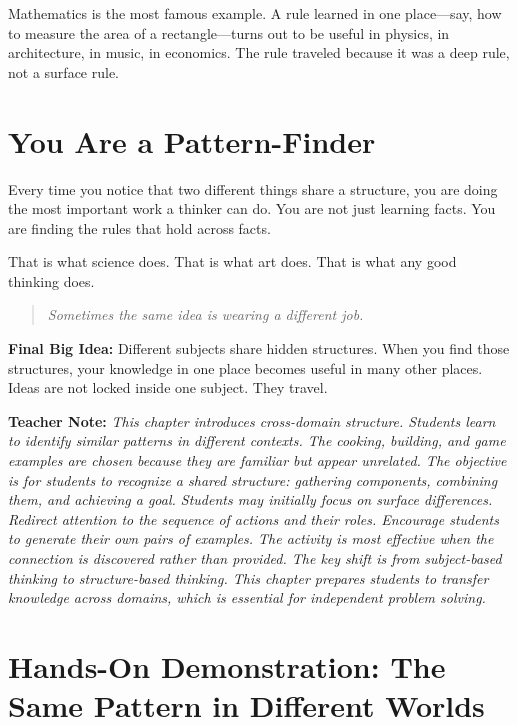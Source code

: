 \documentclass[12pt]{book}
\newenvironment{teachernote}
{\par\medskip\noindent\textbf{Teacher Note:} \itshape}
{\par\medskip}
\begin{document}
Mathematics is the most famous example. A rule learned in one place---say,
how to measure the area of a rectangle---turns out to be useful in physics,
in architecture, in music, in economics. The rule traveled because it was
a deep rule, not a surface rule.

\section{You Are a Pattern-Finder}

Every time you notice that two different things share a structure, you are
doing the most important work a thinker can do. You are not just learning
facts. You are finding the rules that hold across facts.

That is what science does. That is what art does. That is what any good
thinking does.

\begin{quote}\itshape
Sometimes the same idea is wearing a different job.
\end{quote}

\textbf{Final Big Idea:} Different subjects share hidden structures. When
you find those structures, your knowledge in one place becomes useful in
many other places. Ideas are not locked inside one subject. They travel.

\begin{teachernote}
This chapter introduces cross-domain structure. Students learn to identify
similar patterns in different contexts. The cooking, building, and game
examples are chosen because they are familiar but appear unrelated. The
objective is for students to recognize a shared structure: gathering
components, combining them, and achieving a goal. Students may initially
focus on surface differences. Redirect attention to the sequence of
actions and their roles. Encourage students to generate their own pairs
of examples. The activity is most effective when the connection is
discovered rather than provided. The key shift is from subject-based
thinking to structure-based thinking. This chapter prepares students to
transfer knowledge across domains, which is essential for independent
problem solving.
\end{teachernote}

\section*{Hands-On Demonstration: The Same Pattern in Different Worlds}
\end{document}
